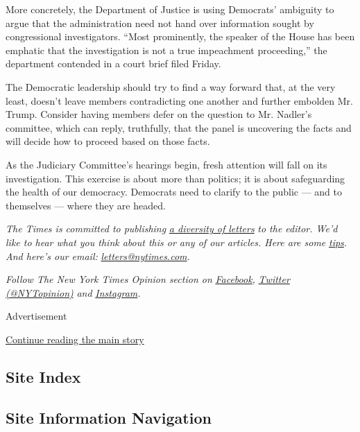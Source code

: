 More concretely, the Department of Justice is using Democrats' ambiguity
to argue that the administration need not hand over information sought
by congressional investigators. ``Most prominently, the speaker of the
House has been emphatic that the investigation is not a true impeachment
proceeding,'' the department contended in a court brief filed Friday.

The Democratic leadership should try to find a way forward that, at the
very least, doesn't leave members contradicting one another and further
embolden Mr. Trump. Consider having members defer on the question to Mr.
Nadler's committee, which can reply, truthfully, that the panel is
uncovering the facts and will decide how to proceed based on those
facts.

As the Judiciary Committee's hearings begin, fresh attention will fall
on its investigation. This exercise is about more than politics; it is
about safeguarding the health of our democracy. Democrats need to
clarify to the public --- and to themselves --- where they are headed.

\emph{The Times is committed to publishing}
\href{https://www.nytimes.com/2019/01/31/opinion/letters/letters-to-editor-new-york-times-women.html}{\emph{a
diversity of letters}} \emph{to the editor. We'd like to hear what you
think about this or any of our articles. Here are some}
\href{https://help.nytimes.com/hc/en-us/articles/115014925288-How-to-submit-a-letter-to-the-editor}{\emph{tips}}\emph{.
And here's our email:}
\href{mailto:letters@nytimes.com}{\emph{letters@nytimes.com}}\emph{.}

\emph{Follow The New York Times Opinion section on}
\href{https://www.facebook.com/nytopinion}{\emph{Facebook}}\emph{,}
\href{http://twitter.com/NYTOpinion}{\emph{Twitter (@NYTopinion)}}
\emph{and}
\href{https://www.instagram.com/nytopinion/}{\emph{Instagram}}\emph{.}

Advertisement

\protect\hyperlink{after-bottom}{Continue reading the main story}

\hypertarget{site-index}{%
\subsection{Site Index}\label{site-index}}

\hypertarget{site-information-navigation}{%
\subsection{Site Information
Navigation}\label{site-information-navigation}}

